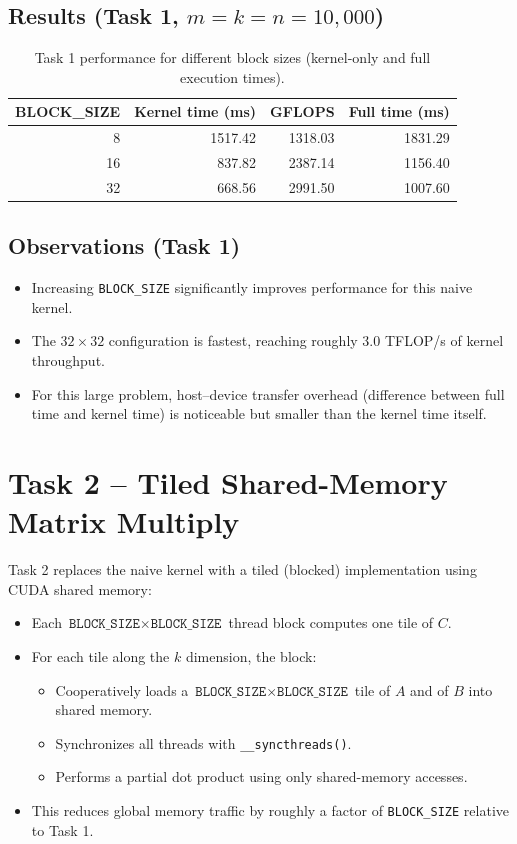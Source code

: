 \documentclass[11pt]{article}
\begin{document}
\subsection*{Results (Task 1, \(m = k = n = 10{,}000\))}

\begin{table}[h]
  \centering
  \begin{tabular}{|r|r|r|r|}
    \hline
    \textbf{BLOCK\_SIZE} & \textbf{Kernel time (ms)} & \textbf{GFLOPS} & \textbf{Full time (ms)} \\
    \hline
    8  & 1517.42 & 1318.03 & 1831.29 \\
    16 &  837.82 & 2387.14 & 1156.40 \\
    32 &  668.56 & 2991.50 & 1007.60 \\
    \hline
  \end{tabular}
  \caption{Task 1 performance for different block sizes (kernel-only and full execution times).}
\end{table}

\subsection*{Observations (Task 1)}

\begin{itemize}
  \item Increasing \texttt{BLOCK\_SIZE} significantly improves performance for this naive kernel.
  \item The \(32 \times 32\) configuration is fastest, reaching roughly 3.0 TFLOP/s of kernel throughput.
  \item For this large problem, host--device transfer overhead (difference between full time and kernel time) is noticeable but smaller than the kernel time itself.
\end{itemize}

\section{Task 2 -- Tiled Shared-Memory Matrix Multiply}

Task 2 replaces the naive kernel with a tiled (blocked) implementation using CUDA shared memory:
\begin{itemize}
  \item Each \(\texttt{BLOCK\_SIZE} \times \texttt{BLOCK\_SIZE}\) thread block computes one tile of \(C\).
  \item For each tile along the \(k\) dimension, the block:
  \begin{itemize}
    \item Cooperatively loads a \(\texttt{BLOCK\_SIZE} \times \texttt{BLOCK\_SIZE}\) tile of \(A\) and of \(B\) into shared memory.
    \item Synchronizes all threads with \texttt{\_\_syncthreads()}.
    \item Performs a partial dot product using only shared-memory accesses.
  \end{itemize}
  \item This reduces global memory traffic by roughly a factor of \texttt{BLOCK\_SIZE} relative to Task 1.
\end{itemize}
\end{document}
